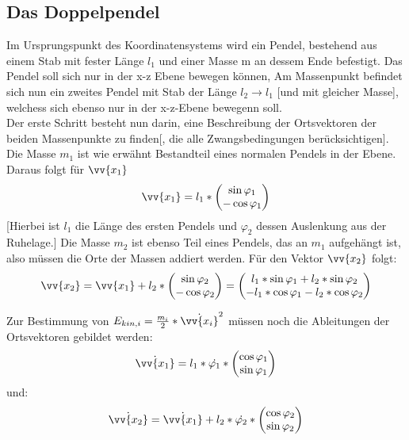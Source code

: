 \subsection{Das Doppelpendel}
Im Ursprungspunkt des Koordinatensystems wird ein Pendel, bestehend aus einem Stab mit fester Länge $l_1$ und einer Masse m an dessem Ende befestigt. Das Pendel soll sich nur in der x-z Ebene bewegen können, Am Massenpunkt befindet sich nun ein zweites Pendel mit Stab der Länge $l_2 \rightarrow l_1$ [und mit gleicher Masse], welchess sich ebenso nur in der x-z-Ebene bewegenn soll. \\
Der erste Schritt besteht nun darin, eine Beschreibung der Ortsvektoren der beiden Massenpunkte zu finden[, die alle Zwangsbedingungen berücksichtigen]. Die Masse $ m_1 $ ist wie erwähnt Bestandteil eines normalen Pendels in der Ebene. Daraus folgt für $ \vv{x_1} $
\begin{equation}
\vv{x_1}= l_1*\begin{pmatrix}
\sin \varphi_1 \\ -\cos \varphi_1
\end{pmatrix}
\end{equation}
[Hierbei ist $ l_1 $ die Länge des ersten Pendels und $ \varphi_2 $ dessen Auslenkung aus der Ruhelage.]
Die Masse $ m_2 $ ist ebenso Teil eines Pendels, das an $m_1$ aufgehängt ist, also müssen die Orte der Massen addiert werden. Für den Vektor $\vv{x_2}$ folgt:
\begin{equation}
\vv{x_2}= \vv{x_1} + l_2 * \begin{pmatrix}
\sin \varphi_2 \\ -\cos \varphi_2
\end{pmatrix}
= \begin{pmatrix}
l_1 * \sin \varphi_1 + l_2 * \sin \varphi_2 \\ - l_1 * \cos \varphi_1 - l_2 * \cos \varphi_2
\end{pmatrix}
\end{equation}


Zur Bestimmung von $E_{kin,i} = \frac{m_i}{2} * \dot{\vv{x_i}}^2$  müssen noch die Ableitungen der Ortsvektoren gebildet werden:
\begin{equation}
\dot{\vv{x_1}} = l_1*\dot{\varphi_1}*\begin{pmatrix}
\cos \varphi_1 \\ \sin \varphi_1
\end{pmatrix}
\end{equation}
und:
\begin{equation}
\dot{\vv{x_2}} = \dot{\vv{x_1}} + l_2 * \dot{\varphi_2} * \begin{pmatrix}
\cos \varphi_2 \\ \sin \varphi_2
\end{pmatrix}
\end{equation}